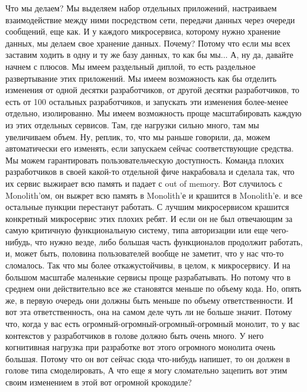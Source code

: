 \documentclass[12pt]{article} %
\begin{document}
Что мы делаем? Мы выделяем набор отдельных приложений, настраиваем взаимодействие между ними посредством сети,  передачи данных через очереди сообщений, еще как.  И у каждого микросервиса, которому нужно хранение данных, мы делаем свое хранение данных. Почему?  Потому что если мы всех заставим ходить в одну и ту же базу данных, то как бы мы... А, ну да, давайте начнем с плюсов.  Мы имеем раздельный диплой, то есть раздельное развертывание этих приложений.  Мы имеем возможность как бы отделить изменения от одной десятки разработчиков, от другой десятки разработчиков, то есть от 100 остальных разработчиков, и запускать эти изменения более-менее отдельно, изолированно.  Мы имеем возможность проще масштабировать каждую из этих отдельных сервисов.  Там, где нагрузки сильно много, там мы увеличиваем объем.  Ну, реплик, то, что мы раньше говорили, да, можем автоматически его изменять, если запускаем сейчас соответствующие средства.  Мы можем гарантировать пользовательческую доступность.  Команда плохих разработчиков в своей какой-то отдельной фиче накрабовала и сделала так, что их сервис выжирает всю память и падает с out of memory.  Вот случилось с Monolith'ом, он выжрет всю память в Monolith'е и крашится в Monolith'е.  и все остальные пункции перестанут работать.  С лучшим микросервисом крашится конкретный микросервис этих плохих ребят.  И если он не был отвечающим за самую критичную функциональную систему, типа авторизации или еще чего-нибудь, что нужно везде, либо большая часть функционалов продолжит работать, и, может быть, половина пользователей вообще не заметит, что у нас что-то сломалось.  Так что мы более откажустойчивы, в целом, к микросервису.  И на большом масштабе маленькие сервисы проще разрабатывать.  Но потому что в среднем они действительно все же становятся меньше по объему кода.  Но, опять же, в первую очередь они должны быть меньше по объему ответственности.  И вот эта ответственность, она на самом деле чуть ли не больше значит.  Потому что, когда у вас есть огромный-огромный-огромный-огромный монолит, то у вас контекстов у разработчиков в голове должно быть очень много.  У него когнитивная нагрузка при разработке вот этого огромного монолита очень большая.  Потому что он вот сейчас сюда что-нибудь напишет, то он должен в голове типа смоделировать, А что еще я могу сломательно зацепить вот этим своим изменением в этой вот огромной крокодиле?
\end{document}
